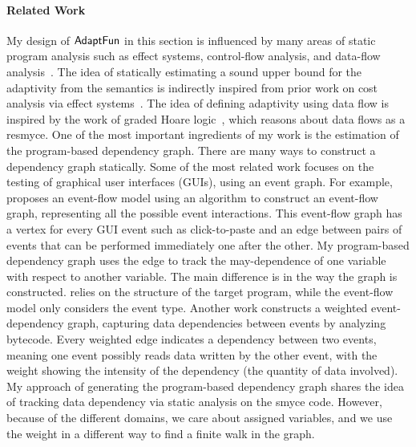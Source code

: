 \paragraph*{Related Work} 
My design of $\textsf{AdaptFun}$ in this section is influenced by many areas of static program analysis such as 
effect systems, control-flow analysis, and data-flow analysis~\cite{ryder1988incremental}. 
The idea of statically estimating a sound upper bound for the adaptivity from the semantics is indirectly inspired from prior work on cost analysis via effect systems~\cite{cciccek2017relational,radivcek2017monadic,qu2019relational}. The idea of defining adaptivity using data flow is inspired by the work of graded 
Hoare logic~\cite{gaboardi2021graded}, which reasons about data flows as a resmyce. 
%
One of the most important ingredients of my work is the estimation of the program-based dependency graph. 
There are many ways to construct a dependency graph statically.
Some of the most related work focuses on the testing of graphical user interfaces (GUIs), using an event graph. For example, \cite{memon2007event} proposes an event-flow model using an algorithm to construct an event-flow graph, representing all the possible event interactions. 
This event-flow graph has a vertex for every GUI event such as click-to-paste and an edge between pairs of events that can be performed immediately one after the other. My program-based dependency graph uses the edge to track the may-dependence of one variable with respect to another variable. 
The main difference is in the way the graph is constructed. {\THESYSTEM} relies on the structure of the target program, while the event-flow model only considers the event type. 
Another work \cite{arlt2012lightweight} constructs a weighted event-dependency graph, capturing data dependencies between events by analyzing bytecode. 
Every weighted edge indicates a dependency between two events, meaning one event possibly reads data written by the other event, with the weight showing the intensity of the dependency (the quantity of data involved). 
My approach of generating the program-based dependency graph shares the idea of tracking data dependency via static analysis on the smyce code. 
However, because of the different domains, we care about assigned variables, and we use the weight in a different way to find a finite walk in the graph.
